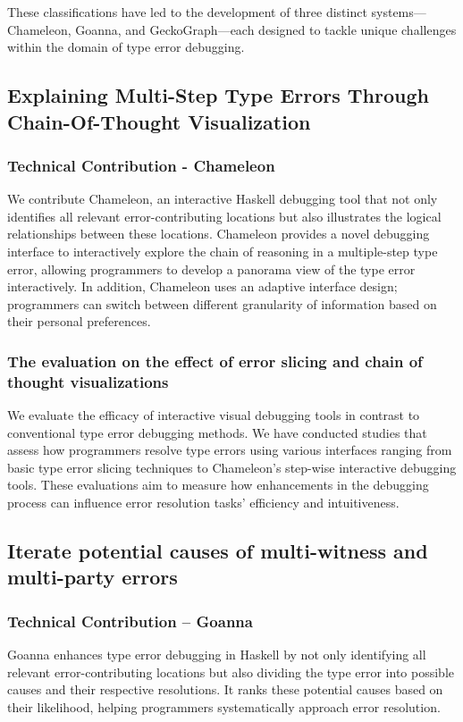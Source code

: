 These classifications have led to the development of three distinct systems—Chameleon, Goanna, and GeckoGraph—each designed to tackle unique challenges within the domain of type error debugging.

\subsection{Explaining Multi-Step Type Errors Through Chain-Of-Thought Visualization}

\subsubsection{Technical Contribution - Chameleon}


We contribute Chameleon, an interactive Haskell debugging tool that not only identifies all relevant error-contributing locations but also illustrates the logical relationships between these locations. Chameleon provides a novel debugging interface to interactively explore the chain of reasoning in a multiple-step type error, allowing programmers to develop a panorama view of the type error interactively. In addition, Chameleon uses an adaptive interface design; programmers can switch between different granularity of information based on their personal preferences. 

\subsubsection{The evaluation on the effect of error slicing and chain of thought visualizations}
We evaluate the efficacy of interactive visual debugging tools in contrast to conventional type error debugging methods. We have conducted studies that assess how programmers resolve type errors using various interfaces ranging from basic type error slicing techniques to Chameleon's step-wise interactive debugging tools. These evaluations aim to measure how enhancements in the debugging process can influence error resolution tasks' efficiency and intuitiveness.

\subsection{Iterate potential causes of multi-witness and multi-party errors}

\subsubsection{Technical Contribution -- Goanna}
Goanna enhances type error debugging in Haskell by not only identifying all relevant error-contributing locations but also dividing the type error into possible causes and their respective resolutions. It ranks these potential causes based on their likelihood, helping programmers systematically approach error resolution.

